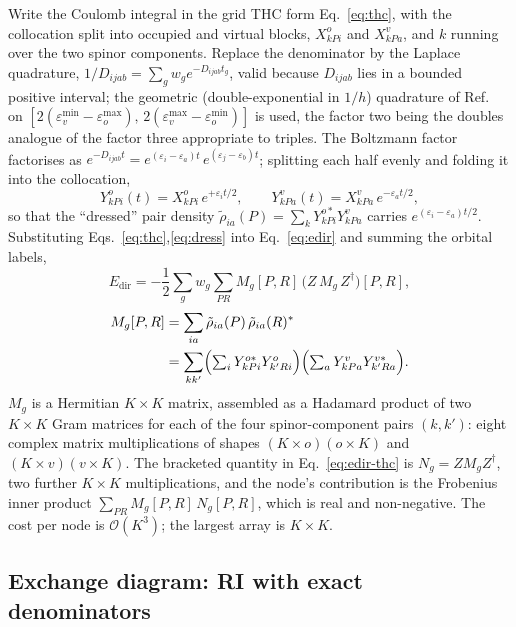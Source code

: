 \documentclass[aip,jcp,amsmath,amssymb,preprint,superscriptaddress]{revtex4-2}%
\newcommand{\Edir}{E_{\mathrm{dir}}}
\newcommand{\Ord}[1]{\mathcal{O}\!\left(#1\right)}
\begin{document}
Write the Coulomb integral in the grid THC form Eq.~\eqref{eq:thc}, with the
collocation split into occupied and virtual blocks, $X^{o}_{kPi}$ and
$X^{v}_{kPa}$, and $k$ running over the two spinor components. Replace the
denominator by the Laplace quadrature,
$1/D_{ijab}=\sum_g w_g e^{-D_{ijab}t_g}$, valid because $D_{ijab}$ lies in a
bounded positive interval; the geometric (double-exponential in $1/h$)
quadrature of Ref.~ on
$[2(\varepsilon_v^{\min}-\varepsilon_o^{\max}),\,
  2(\varepsilon_v^{\max}-\varepsilon_o^{\min})]$ is used, the factor two
being the doubles analogue of the factor three appropriate to triples.
The Boltzmann factor factorises as
$e^{-D_{ijab}t}=e^{(\varepsilon_i-\varepsilon_a)t}\,
e^{(\varepsilon_j-\varepsilon_b)t}$; splitting each half evenly and folding
it into the collocation,
\begin{equation}
  Y^{o}_{kPi}(t)=X^{o}_{kPi}\,e^{+\varepsilon_i t/2},
  \qquad
  Y^{v}_{kPa}(t)=X^{v}_{kPa}\,e^{-\varepsilon_a t/2},
  \label{eq:dress}
\end{equation}
so that the ``dressed'' pair density
$\tilde\rho_{ia}(P)=\sum_k Y^{o*}_{kPi}Y^{v}_{kPa}$ carries
$e^{(\varepsilon_i-\varepsilon_a)t/2}$. Substituting
Eqs.~\eqref{eq:thc},\eqref{eq:dress} into Eq.~\eqref{eq:edir} and summing the
orbital labels,
\begin{equation}
  \Edir = -\frac12 \sum_g w_g
          \sum_{PR} M_g[P,R]\,\bigl(Z\,M_g\,Z^{\dagger}\bigr)[P,R],
  \label{eq:edir-thc}
\end{equation}
\begin{align}
  M_g[P,R] &= \sum_{ia}\tilde\rho_{ia}(P)\,\tilde\rho_{ia}(R)^{*}
  \nonumber\\
  &= \sum_{kk'}
     \Bigl(\textstyle\sum_i Y^{o*}_{kPi}Y^{o}_{k'Ri}\Bigr)
     \Bigl(\textstyle\sum_a Y^{v}_{kPa}Y^{v*}_{k'Ra}\Bigr).
  \label{eq:Mg}
\end{align}
$M_g$ is a Hermitian $K\times K$ matrix, assembled as a Hadamard product of
two $K\times K$ Gram matrices for each of the four spinor-component pairs
$(k,k')$: eight complex matrix multiplications of shapes $(K\times o)(o\times
K)$ and $(K\times v)(v\times K)$. The bracketed quantity in
Eq.~\eqref{eq:edir-thc} is $N_g=Z M_g Z^{\dagger}$, two further $K\times K$
multiplications, and the node's contribution is the Frobenius inner product
$\sum_{PR}M_g[P,R]\,N_g[P,R]$, which is real and non-negative. The cost per
node is $\Ord{K^3}$; the largest array is $K\times K$.

\subsection{Exchange diagram: RI with exact denominators}
\end{document}
